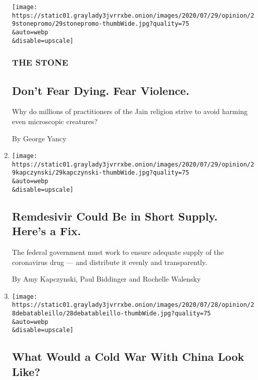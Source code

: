 \begin{enumerate}
  \texttt{[image: https://static01.graylady3jvrrxbe.onion/images/2020/07/29/opinion/29stonepromo/29stonepromo-thumbWide.jpg?quality=75\\\&auto=webp\\\&disable=upscale]}

  \hypertarget{the-stone}{%
  \subsubsection{THE STONE}\label{the-stone}}

  \hypertarget{dont-fear-dying-fear-violence}{%
  \subsection{Don't Fear Dying. Fear
  Violence.}\label{dont-fear-dying-fear-violence}}

  Why do millions of practitioners of the Jain religion strive to avoid
  harming even microscopic creatures?

  By George Yancy
\item
  \href{/2020/07/28/opinion/remdesivir-shortage-coronavirus.html}{}

  \texttt{[image: https://static01.graylady3jvrrxbe.onion/images/2020/07/29/opinion/29kapczynski/29kapczynski-thumbWide.jpg?quality=75\\\&auto=webp\\\&disable=upscale]}

  \hypertarget{remdesivir-could-be-in-short-supply-heres-a-fix}{%
  \subsection{Remdesivir Could Be in Short Supply. Here's a
  Fix.}\label{remdesivir-could-be-in-short-supply-heres-a-fix}}

  The federal government must work to ensure adequate supply of the
  coronavirus drug --- and distribute it evenly and transparently.

  By Amy Kapczynski, Paul Biddinger and Rochelle Walensky
\item
  \href{/2020/07/28/opinion/trump-china.html}{}

  \texttt{[image: https://static01.graylady3jvrrxbe.onion/images/2020/07/28/opinion/28debatableillo/28debatableillo-thumbWide.jpg?quality=75\\\&auto=webp\\\&disable=upscale]}

  \hypertarget{what-would-a-cold-war-with-china-look-like}{%
  \subsection{What Would a Cold War With China Look
  Like?}\label{what-would-a-cold-war-with-china-look-like}}


\end{enumerate}
